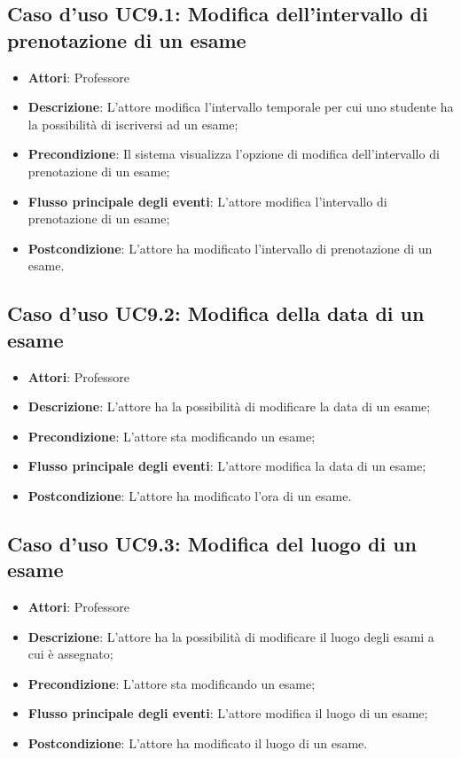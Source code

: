 \subsection{Caso d'uso \texorpdfstring{UC9.1}{UC9.1}: Modifica dell'intervallo di prenotazione di un esame}
\begin{itemize}
\item \textbf{Attori}: Professore
\item \textbf{Descrizione}: L'attore modifica l'intervallo temporale per cui uno studente ha la possibilità di iscriversi ad un esame;
\item \textbf{Precondizione}: Il sistema visualizza l'opzione di modifica dell'intervallo di prenotazione di un esame;
\item \textbf{Flusso principale degli eventi}: L'attore modifica l'intervallo di prenotazione di un esame;
\item \textbf{Postcondizione}: L'attore ha modificato l'intervallo di prenotazione di un esame.
\end{itemize}
\subsection{Caso d'uso \texorpdfstring{UC9.2}{UC9.2}: Modifica della data di un esame}
\begin{itemize}
\item \textbf{Attori}: Professore
\item \textbf{Descrizione}: L'attore ha la possibilità di modificare la data di un esame;
\item \textbf{Precondizione}: L'attore sta modificando un esame;
\item \textbf{Flusso principale degli eventi}: L'attore modifica la data di un esame;
\item \textbf{Postcondizione}: L'attore ha modificato l'ora di un esame.
\end{itemize}
\subsection{Caso d'uso \texorpdfstring{UC9.3}{UC9.3}: Modifica del luogo di un esame}
\begin{itemize}
\item \textbf{Attori}: Professore
\item \textbf{Descrizione}: L'attore ha la possibilità di modificare il luogo degli esami a cui è assegnato;
\item \textbf{Precondizione}: L'attore sta modificando un esame;
\item \textbf{Flusso principale degli eventi}: L'attore modifica il luogo di un esame;
\item \textbf{Postcondizione}: L'attore ha modificato il luogo di un esame.
\end{itemize}
